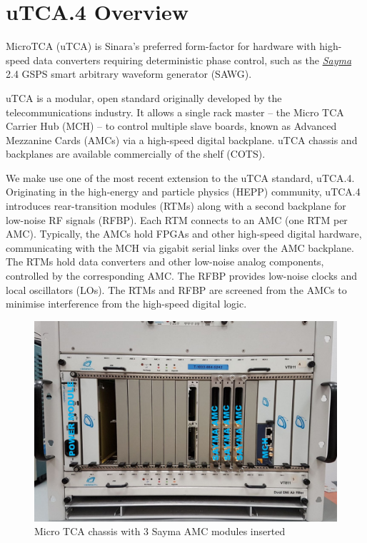 \section{uTCA.4 Overview}

MicroTCA (uTCA) is Sinara's preferred form-factor for hardware with
high-speed data converters requiring deterministic phase control, such
as the \href{Sayma}{\emph{Sayma}} 2.4 GSPS smart arbitrary waveform
generator (SAWG).

uTCA is a modular, open standard originally developed by the
telecommunications industry. It allows a single rack master -- the Micro
TCA Carrier Hub (MCH) -- to control multiple slave boards, known as
Advanced Mezzanine Cards (AMCs) via a high-speed digital backplane. uTCA
chassis and backplanes are available commercially of the shelf (COTS).

We make use one of the most recent extension to the uTCA standard, uTCA.4.
Originating in the high-energy and particle physics (HEPP) community,
uTCA.4 introduces rear-transition modules (RTMs) along with a second
backplane for low-noise RF signals (RFBP). Each RTM connects to an AMC
(one RTM per AMC). Typically, the AMCs hold FPGAs and other high-speed
digital hardware, communicating with the MCH via gigabit serial links
over the AMC backplane. The RTMs hold data converters and other
low-noise analog components, controlled by the corresponding AMC. The
RFBP provides low-noise clocks and local oscillators (LOs). The RTMs and
RFBP are screened from the AMCs to minimise interference from the
high-speed digital logic.

\begin{figure}[htbp!]
\centering
\includegraphics[width=15cm]{img/MTCA_Front1.jpg}
\caption{Micro TCA chassis with 3 Sayma AMC modules inserted}
\end{figure}

